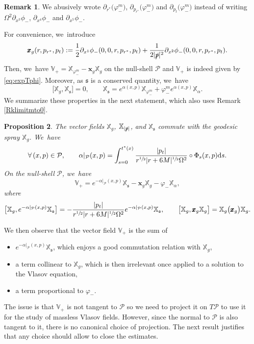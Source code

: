 \documentclass[10pt]{amsart}
\theoremstyle{plain}
\newtheorem{proposition}{Proposition}[section]
\theoremstyle{definition}
\newtheorem{remark}[proposition]{Remark}
\newcommand\T{{\mathbb{X}}}
\newcommand\dr{{\mathrm{d}}}
\begin{document}
\begin{remark}\label{Rkabuse}
We abusively wrote $\partial_{r^*}\bigl(\varphi_-^m \bigr)$, $\partial_{p_{r^*}}\bigl(\varphi_-^m \bigr)$ and $\partial_{p_t}\bigl(\varphi_-^m \bigr)$ instead of writing $\Omega^2 \partial_{x^3}\phi_-$, $\partial_{x^4} \phi_-$ and $\partial_{x^5} \phi_-$.
\end{remark} For convenience, we~introduce
\[
\pmb{x}_g(r,p_{r^*},p_t) := \frac{1}{2}\partial_{x^1} \phi_-(0,0,r,p_{r^*},p_t) +\frac{1}{2|\slashed{p}|^2} \partial_{x^2} \phi_- (0,0,r,p_{r^*},p_t).
\]
Then, we~have $\mathbb{V}_+=\T_{\varphi_-^m}-\pmb{x}_g \T_g$ on the null-shell $\mathcal{P}$ and $\mathbb{V}_+$ is indeed given by \eqref{eq:expTphi}. Moreover, as $\mathfrak{s}$ is a conserved quantity, we~have
\[
\bigl[ \T_g, \T_{\mathfrak{s}} \bigr]=0,\qquad \T_{\mathfrak{s}} = e^{\alpha (x,p)} \T_{\varphi_-^m}+\varphi_-^m e^{\alpha (x,p)} \T_{\alpha}.
\]
We summarize these properties in the next statement, which also uses Remark \ref{Rklimitmto0}.
\begin{proposition}\label{ProB2}
The vector fields $\T_g$, $\T_{|\slashed{p}|}$, and $\T_{\mathfrak{s}}$ commute with the geodesic spray $\T_g$. We~have
\[
\forall \, (x,p) \in \mathcal{P}, \qquad \alpha \vert_{\mathcal{P}} (x,p) = \int_{s=0}^{t^*(x)} \frac{|p_t|}{r^{\sfrac{1}{2}}|r+6M|^{\sfrac{1}{2}}\Omega^2} \circ \Phi_{s}(x,p) \dr s.
\]
On the null-shell $\mathcal{P}$, we~have
\[
\mathbb{V}_+ = e^{-\alpha \vert_{\mathcal{P}}(x,p)} \T_{\mathfrak{s}}-\pmb{x}_g \T_g-\varphi_- \T_{\alpha},
\]
where
\[
\bigl[\T_g, e^{-\alpha \vert_{\mathcal{P}}(x,p)} \T_{\mathfrak{s}} \bigr] = -\frac{|p_t|}{r^{\sfrac{1}{2}}|r+6M|^{\sfrac{1}{2}}\Omega^2} e^{-\alpha \vert_{\mathcal{P}}(x,p)}\T_{\mathfrak{s}}, \qquad \bigl[\T_g, \pmb{x}_g \T_g \bigr] = \T_g \bigl(\pmb{x}_g \bigr) \T_g.
\]
\end{proposition}

We then observe that the vector field $\mathbb{V}_+$ is the sum of
\begin{itemize}
\item $e^{-\alpha \vert_{\mathcal{P}}(x,p)} \T_{\mathfrak{s}}$, which enjoys a good commutation relation with $\T_g$,
\item a term collinear to $\T_g$, which is then irrelevant once applied to a solution to the Vlasov equation,
\item a term proportional to $\varphi_-$.
\end{itemize}
The issue is that $\mathbb{V}_+$ is not tangent to $\mathcal{P}$ so we need to project it on $T \mathcal{P}$ to use it for the study of massless Vlasov fields. However, since the normal to $\mathcal{P}$ is also tangent to it, there is no canonical choice of projection. The next result justifies that any choice should allow to close the estimates.
\end{document}

